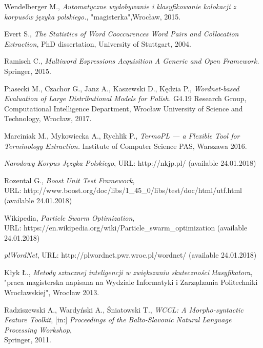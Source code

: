 \begin{thebibliography}{9}

Wendelberger M., 
\textit{Automatyczne wydobywanie i klasyfikowanie kolokacji z korpusów języka polskiego.}, 
"magisterka",Wrocław, 2015.

Evert S.,
\textit{The Statistics of Word Cooccurences Word Pairs and Collocation Extraction}, 
PhD dissertation, University of Stuttgart, 2004.

Ramisch C., 
\textit{Multiword Espressions Acquisition A Generic and Open Framework.} 
Springer, 2015.

Piasecki M., Czachor G., Janz A., Kaszewski D., Kędzia P.,
\textit{Wordnet-based Evaluation of Large Distributional Models for Polish.} 
G4.19 Research Group, Computational Intelligence Department, Wrocław University of Science and Technology, Wrocław, 2017.

Marciniak M., Mykowiecka A., Rychlik P.,
\textit{TermoPL — a Flexible Tool for Terminology Extraction.} 
Institute of Computer Science PAS, Warszawa 2016.

\textit{Narodowy Korpus Języka Polskiego}, 
URL: http://nkjp.pl/ (available 24.01.2018)

Rozental G., \textit{Boost Unit Test Framework}, \\
URL: http://www.boost.org/doc/libs/1\_45\_0/libs/test/doc/html/utf.html (available 24.01.2018)

Wikipedia, \textit{Particle Swarm Optimization}, \\
URL: https://en.wikipedia.org/wiki/Particle\_swarm\_optimization (available 24.01.2018)

\textit{plWordNet}, 
URL: http://plwordnet.pwr.wroc.pl/wordnet/ (available 24.01.2018)

Kłyk Ł., \emph{Metody sztucznej inteligencji w zwiększaniu skuteczności klasyfikatora}, \\
"praca magisterska napisana na Wydziale Informatyki i Zarządzania Politechniki Wrocławskiej", Wrocław 2013.

Radziszewski A., Wardyński A., Śniatowski T., \emph{WCCL: A Morpho-syntactic Feature Toolkit}, [in:] \emph{Proceedings of the Balto-Slavonic Natural Language Processing Workshop}, \\
Springer, 2011.


\end{thebibliography}